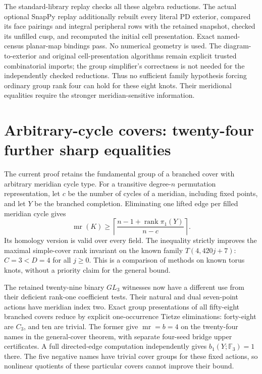 \documentclass[11pt]{article}
\newcommand{\mr}{\operatorname{mr}}
\begin{document}
The standard-library replay checks all these algebra reductions.
The actual optional SnapPy replay additionally rebuilt every literal
PD exterior, compared its face pairings and integral peripheral
rows with the retained snapshot, checked its unfilled cusp, and
recomputed the initial cell presentation. Exact named-census
planar-map bindings pass. No numerical geometry is used.
The diagram-to-exterior and original cell-presentation algorithms
remain explicit trusted combinatorial imports; the group simplifier's
correctness is not needed for the independently checked reductions.
Thus no sufficient family hypothesis forcing ordinary group rank
four can hold for these eight knots. Their meridional equalities
require the stronger meridian-sensitive information.

{\small

\section{Arbitrary-cycle covers: twenty-four further sharp equalities}

The current proof  retains
the fundamental group of a branched cover with arbitrary meridian
cycle type. For a transitive degree-$n$ permutation representation,
let $c$ be the number of cycles of a meridian, including fixed points,
and let $Y$ be the branched completion. Eliminating one lifted edge
per filled meridian cycle gives
\[
 \mr(K)\ge
 \left\lceil\frac{n-1+\operatorname{rank}\pi_1(Y)}{n-c}\right\rceil.
\]
Its homology version is valid over every field.
The inequality strictly improves the maximal simple-cover rank
invariant on the known family $T(4,420j+7)$: $C=3<D=4$ for all $j\ge0$.
This is a comparison of methods on known torus knots, without a
priority claim for the general bound.

The retained twenty-nine binary $GL_3$ witnesses now have a different
use from their deficient rank-one coefficient tests. Their natural
and dual seven-point actions have meridian index two. Exact group
presentations of all fifty-eight branched covers reduce by explicit
one-occurrence Tietze eliminations: forty-eight are $C_3$, and ten
are trivial. The former give $\mr=b=4$ on the twenty-four names in
the general-cover theorem, with separate four-seed bridge upper
certificates. A full directed-edge computation independently gives
$b_1(Y;\mathbb F_3)=1$ there. The five negative names have trivial
cover groups for these fixed actions, so nonlinear quotients of these
particular covers cannot improve their bound.

}
\end{document}
